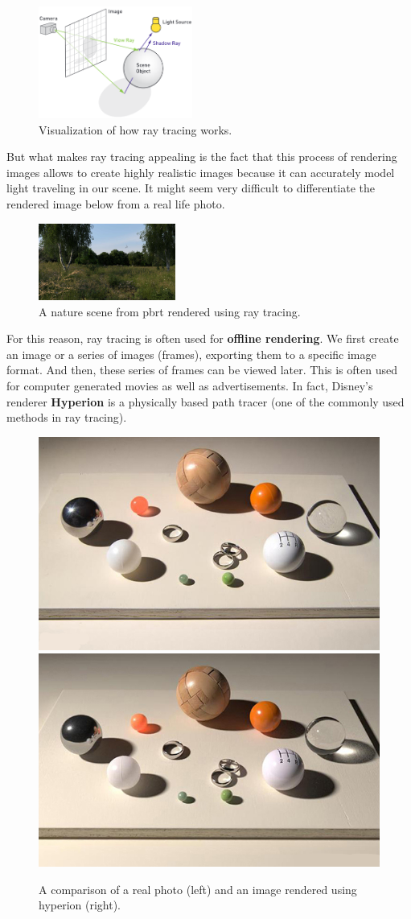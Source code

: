 \documentclass[11pt,a4paper]{article}
\begin{document}
\begin{figure}[H]
	\centering
	\captionsetup{justification=centering,margin=2cm}
	\includegraphics[width=0.45\textwidth]{raytracing_gems}
	\caption{Visualization of how ray tracing works. \protect\cite{haines2019ray}}
\end{figure}
\noindent
But what makes ray tracing appealing
is the fact that this process of rendering images allows to create highly realistic images because it can accurately
model light traveling in our scene. It might seem very difficult to differentiate the rendered image below from a real life photo.

\begin{figure}[H]
	\centering
	\captionsetup{justification=centering,margin=2cm}
	\includegraphics[width=0.4\textwidth]{landing}
	\caption{A nature scene from pbrt rendered using ray tracing. \protect\cite{pharr2016physically}}
\end{figure}

\noindent
For this reason, ray tracing is often used for \textbf{offline rendering}. We first create an image or a series of images (frames), exporting them to a specific image format. And then, these series of frames can be viewed later. This is often used for computer generated movies as well as advertisements. In fact, Disney's renderer \textbf{Hyperion} is a physically based path tracer (one of the commonly used methods in ray tracing). 

\begin{figure}[H]
	\centering
	\captionsetup{justification=centering}
	\includegraphics[width=.35\textwidth]{real_photo}\quad
	\includegraphics[width=.35\textwidth]{hyperion}\quad
	\caption{A comparison of a real photo (left) and an image rendered using hyperion (right). \protect\cite{burley2018design}}
\end{figure}
\end{document}

